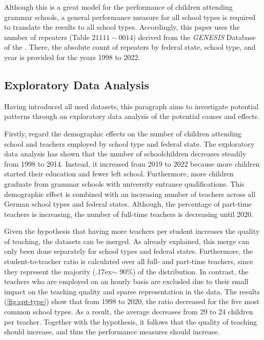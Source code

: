 Although this is a great model for the performance of children attending grammar schools, a general performance measure for all school types is required to translate the results to all school types. Accordingly, this paper uses the number of repeaters (Table $21111-0014$) derived from the \textit{{GENESIS}} Database of the \citeauthor{statistische_bundesamt_statistisches_2023}. There, the absolute count of repeaters by federal state, school type, and year is provided for the years 1998 to 2022.


\subsection{Exploratory Data Analysis}

Having introduced all used datasets, this paragraph aims to investigate potential patterns through an exploratory data analysis of the potential causes and effects. 

Firstly, regard the demographic effects on the number of children attending school and teachers employed by school type and federal state. The exploratory data analysis has shown that the number of schoolchildren decreases steadily from 1998 to 2014. Instead, it increased from 2019 to 2022 because more children started their education and fewer left school. Furthermore, more children graduate from grammar schools with university entrance qualifications. This demographic effect is combined with an increasing number of teachers across all German school types and federal states. Although, the percentage of part-time teachers is increasing, the number of full-time teachers is decreasing until 2020.

Given the hypothesis that having more teachers per student increases the quality of teaching, the datasets can be merged. As already explained, this merge can only been done separately for school types and federal states. Furthermore, the student-to-teacher ratio is calculated over all full- and part-time teachers, since they represent the majority ({\raise.17ex\hbox{$\scriptstyle\mathtt{\sim}$}} $90\%$) of the distribution. In contrast, the teachers who are employed on an hourly basis are excluded due to their small impact on the teaching quality and sparse representation in the data. The results (\autoref{fig:spt-type}) show that from 1998 to 2020, the ratio decreased for the five most common school types. As a result, the average decreases from 29 to 24 children per teacher. Together with the hypothesis, it follows that the quality of teaching should increase, and thus the performance measures should increase.

